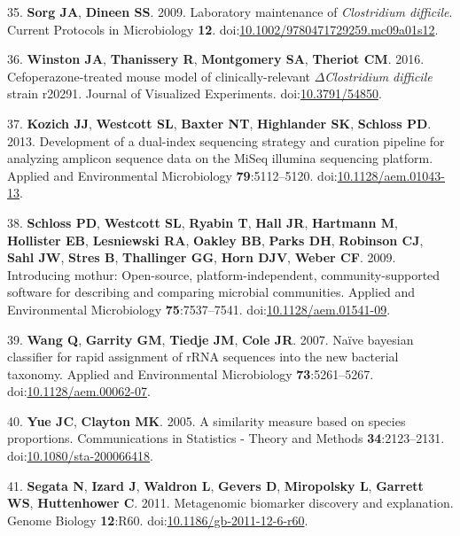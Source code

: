 \documentclass[
  12pt,
]{article}
\newenvironment{cslreferences}%
  {}%
  {\par}
\begin{document}
\begin{cslreferences}
\leavevmode\hypertarget{ref-Sorg2009}{}%
35. \textbf{Sorg JA}, \textbf{Dineen SS}. 2009. Laboratory maintenance
of \emph{Clostridium difficile}. Current Protocols in Microbiology
\textbf{12}.
doi:\href{https://doi.org/10.1002/9780471729259.mc09a01s12}{10.1002/9780471729259.mc09a01s12}.

\leavevmode\hypertarget{ref-Winston2016}{}%
36. \textbf{Winston JA}, \textbf{Thanissery R}, \textbf{Montgomery SA},
\textbf{Theriot CM}. 2016. Cefoperazone-treated mouse model of
clinically-relevant \(\Delta\)\emph{Clostridium difficile} strain
r20291. Journal of Visualized Experiments.
doi:\href{https://doi.org/10.3791/54850}{10.3791/54850}.

\leavevmode\hypertarget{ref-Kozich2013}{}%
37. \textbf{Kozich JJ}, \textbf{Westcott SL}, \textbf{Baxter NT},
\textbf{Highlander SK}, \textbf{Schloss PD}. 2013. Development of a
dual-index sequencing strategy and curation pipeline for analyzing
amplicon sequence data on the MiSeq illumina sequencing platform.
Applied and Environmental Microbiology \textbf{79}:5112--5120.
doi:\href{https://doi.org/10.1128/aem.01043-13}{10.1128/aem.01043-13}.

\leavevmode\hypertarget{ref-Schloss2009}{}%
38. \textbf{Schloss PD}, \textbf{Westcott SL}, \textbf{Ryabin T},
\textbf{Hall JR}, \textbf{Hartmann M}, \textbf{Hollister EB},
\textbf{Lesniewski RA}, \textbf{Oakley BB}, \textbf{Parks DH},
\textbf{Robinson CJ}, \textbf{Sahl JW}, \textbf{Stres B},
\textbf{Thallinger GG}, \textbf{Horn DJV}, \textbf{Weber CF}. 2009.
Introducing mothur: Open-source, platform-independent,
community-supported software for describing and comparing microbial
communities. Applied and Environmental Microbiology
\textbf{75}:7537--7541.
doi:\href{https://doi.org/10.1128/aem.01541-09}{10.1128/aem.01541-09}.

\leavevmode\hypertarget{ref-Wang2007}{}%
39. \textbf{Wang Q}, \textbf{Garrity GM}, \textbf{Tiedje JM},
\textbf{Cole JR}. 2007. Naïve bayesian classifier for rapid assignment
of rRNA sequences into the new bacterial taxonomy. Applied and
Environmental Microbiology \textbf{73}:5261--5267.
doi:\href{https://doi.org/10.1128/aem.00062-07}{10.1128/aem.00062-07}.

\leavevmode\hypertarget{ref-Yue2005}{}%
40. \textbf{Yue JC}, \textbf{Clayton MK}. 2005. A similarity measure
based on species proportions. Communications in Statistics - Theory and
Methods \textbf{34}:2123--2131.
doi:\href{https://doi.org/10.1080/sta-200066418}{10.1080/sta-200066418}.

\leavevmode\hypertarget{ref-Segata2011}{}%
41. \textbf{Segata N}, \textbf{Izard J}, \textbf{Waldron L},
\textbf{Gevers D}, \textbf{Miropolsky L}, \textbf{Garrett WS},
\textbf{Huttenhower C}. 2011. Metagenomic biomarker discovery and
explanation. Genome Biology \textbf{12}:R60.
doi:\href{https://doi.org/10.1186/gb-2011-12-6-r60}{10.1186/gb-2011-12-6-r60}.


\end{cslreferences}
\end{document}
